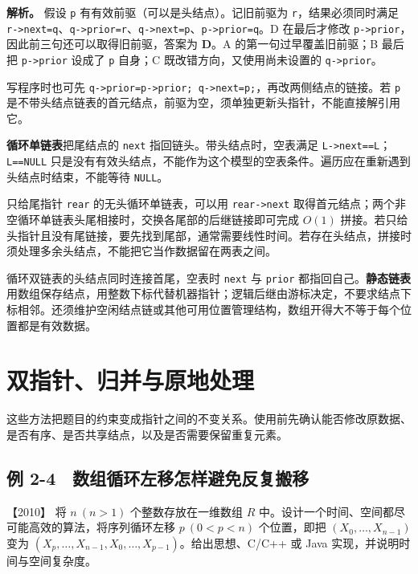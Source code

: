 \textbf{解析。} 假设 \texttt{p} 有有效前驱（可以是头结点）。记旧前驱为 \texttt{r}，结果必须同时满足 \texttt{r-\textgreater{}next=q}、\texttt{q-\textgreater{}prior=r}、\texttt{q-\textgreater{}next=p}、\texttt{p-\textgreater{}prior=q}。D 在最后才修改 \texttt{p-\textgreater{}prior}，因此前三句还可以取得旧前驱，答案为 \textbf{D}。A 的第一句过早覆盖旧前驱；B 最后把 \texttt{p-\textgreater{}prior} 设成了 \texttt{p} 自身；C 既改错方向，又使用尚未设置的 \texttt{q-\textgreater{}prior}。

写程序时也可先 \texttt{q-\textgreater{}prior=p-\textgreater{}prior;}\allowbreak{}\texttt{\ q-\textgreater{}next=p;}\allowbreak{}，再改两侧结点的链接。若 \texttt{p} 是不带头结点链表的首元结点，前驱为空，须单独更新头指针，不能直接解引用它。

\textbf{循环单链表}把尾结点的 \texttt{next} 指回链头。带头结点时，空表满足 \texttt{L-\textgreater{}next==L}；\texttt{L==NULL} 只是没有有效头结点，不能作为这个模型的空表条件。遍历应在重新遇到头结点时结束，不能等待 \texttt{NULL}。

只给尾指针 \texttt{rear} 的无头循环单链表，可以用 \texttt{rear-\textgreater{}next} 取得首元结点；两个非空循环单链表头尾相接时，交换各尾部的后继链接即可完成 \(O(1)\) 拼接。若只给头指针且没有尾链接，要先找到尾部，通常需要线性时间。若存在头结点，拼接时须处理多余头结点，不能把它当作数据留在两表之间。

循环双链表的头结点同时连接首尾，空表时 \texttt{next} 与 \texttt{prior} 都指回自己。\textbf{静态链表}用数组保存结点，用整数下标代替机器指针；逻辑后继由游标决定，不要求结点下标相邻。还须维护空闲结点链或其他可用位置管理结构，数组开得大不等于每个位置都是有效数据。

\section{双指针、归并与原地处理}\label{ds-02-05}

这些方法把题目的约束变成指针之间的不变关系。使用前先确认能否修改原数据、是否有序、是否共享结点，以及是否需要保留重复元素。

\subsection{例 2-4　数组循环左移怎样避免反复搬移}\label{ds-ex2-4}

\noindent{}【2010】 将 \(n\ (n>1)\) 个整数存放在一维数组 \(R\) 中。设计一个时间、空间都尽可能高效的算法，将序列循环左移 \(p\ (0<p<n)\) 个位置，即把 \((X_0,\ldots,X_{n-1})\) 变为 \((X_p,\ldots,X_{n-1},X_0,\ldots,X_{p-1})\)。给出思想、C/C++ 或 Java 实现，并说明时间与空间复杂度。

